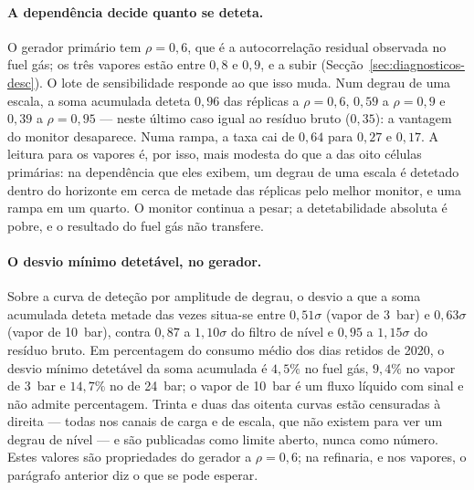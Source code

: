 \paragraph{A dependência decide quanto se deteta.} O gerador primário tem
$\rho = 0{,}6$, que é a autocorrelação residual observada no fuel gás; os
três vapores estão entre $0{,}8$ e $0{,}9$, e a subir
(Secção~\ref{sec:diagnosticos-desc}). O lote de sensibilidade responde ao que
isso muda. Num degrau de uma escala, a soma acumulada deteta $0{,}96$ das
réplicas a $\rho = 0{,}6$, $0{,}59$ a $\rho = 0{,}9$ e $0{,}39$ a
$\rho = 0{,}95$ --- neste último caso igual ao resíduo bruto ($0{,}35$): a
vantagem do monitor desaparece. Numa rampa, a taxa cai de $0{,}64$ para
$0{,}27$ e $0{,}17$. A leitura para os vapores é, por isso, mais modesta do
que a das oito células primárias: na dependência que eles exibem, um degrau
de uma escala é detetado dentro do horizonte em cerca de metade das
réplicas pelo melhor monitor, e uma rampa em um quarto. O monitor continua
a pesar; a detetabilidade absoluta é pobre, e o resultado do fuel gás não
transfere.

\paragraph{O desvio mínimo detetável, no gerador.} Sobre a curva de deteção
por amplitude de degrau, o desvio a que a soma acumulada deteta metade das
vezes situa-se entre $0{,}51\sigma$ (vapor de 3~bar) e $0{,}63\sigma$ (vapor
de 10~bar), contra $0{,}87$ a $1{,}10\sigma$ do filtro de nível e $0{,}95$ a
$1{,}15\sigma$ do resíduo bruto. Em percentagem do consumo médio dos dias
retidos de 2020, o desvio mínimo detetável da soma acumulada é $4{,}5\%$ no
fuel gás, $9{,}4\%$ no vapor de 3~bar e $14{,}7\%$ no de 24~bar; o vapor de
10~bar é um fluxo líquido com sinal e não admite percentagem. Trinta e duas
das oitenta curvas estão censuradas à direita --- todas nos canais de carga e
de escala, que não existem para ver um degrau de nível --- e são publicadas
como limite aberto, nunca como número. Estes valores são propriedades do
gerador a $\rho = 0{,}6$; na refinaria, e nos vapores, o parágrafo anterior
diz o que se pode esperar.

